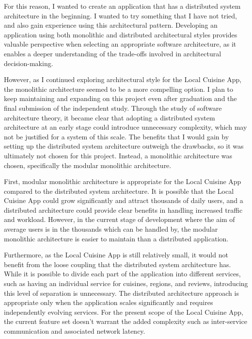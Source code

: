 For this reason, I wanted to create an application that has a distributed system architecture in the beginning. I wanted to try something that I have not tried,
and also gain experience using this architectural pattern. Developing an application using both monolithic and distributed architectural styles provides valuable
perspective when selecting an appropriate software architecture, as it enables a deeper understanding of the trade-offs involved in architectural decision-making. 

However, as I continued exploring architectural style for the Local Cuisine App, the monolithic architecture seemed to be a more compelling option.
I plan to keep maintaining and expanding on this project even after graduation and the final submission of the independent study.
Through the study of software architecture theory, it became clear that adopting a distributed system architecture at an early stage could introduce unnecessary complexity,
which may not be justified for a system of this scale. 
The benefits that I would gain by setting up the distributed system architecture outweigh the drawbacks, so it was ultimately not chosen for this project.
Instead, a monolithic architecture was chosen, specifically the modular monolithic architecture.

First, modular monolithic architecture is appropriate for the Local Cuisine App compared to the distributed system architecture.
It is possible that the Local Cuisine App could grow significantly and attract thousands of daily users,
and a distributed architecture could provide clear benefits in handling increased traffic and workload. However, in the current stage of development where the aim of 
average users is in the thousands which can be handled by, the modular monolithic architecture is easier to maintain than a distributed application.  

Furthermore, as the Local Cuisine App is still relatively small, it would not benefit from the loose coupling that the distributed system architecture has.
While it is possible to divide each part of the application into different services, such as having an individual service for cuisines, regions, and reviews,
introducing this level of separation is unnecessary.
The distributed architecture approach is appropriate only when the application scales significantly and requires independently evolving services.
For the present scope of the Local Cuisine App, the current feature set doesn't warrant the added complexity
such as inter-service communication and associated network latency.

